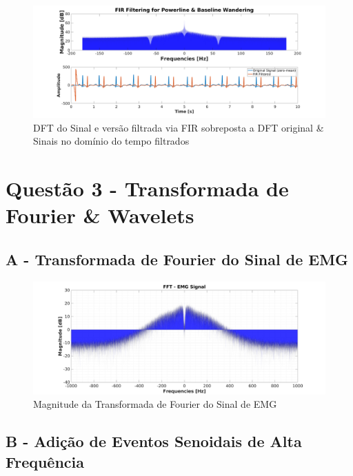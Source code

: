 \documentclass{article}
\begin{document}
\begin{figure}[H]
	\begin{center}
		\includegraphics[scale=0.25]{../Q2_FIR-Filter-Time.png}
		\caption{DFT do Sinal e versão filtrada via FIR sobreposta a DFT original \& Sinais no domínio do tempo filtrados}
		\label{fig:Q2_FIR}
	\end{center}
\end{figure}
\section*{Questão 3 - Transformada de Fourier \& Wavelets}
\subsection*{A - Transformada de Fourier do Sinal de EMG}

\begin{figure}[H]
	\begin{center}
		\includegraphics[scale=0.25]{../Q3_FFT.png}
		\caption{Magnitude da Transformada de Fourier do Sinal de EMG}
		\label{fig:Q3_FFT}
	\end{center}
\end{figure}

\subsection*{B - Adição de Eventos Senoidais de Alta Frequência}
\end{document}
